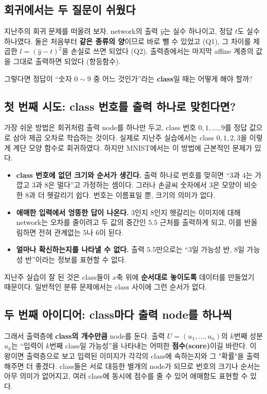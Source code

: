\documentclass[11pt,a4paper]{article}
\begin{document}
\subsection{회귀에서는 두 질문이 쉬웠다}

지난주의 회귀 문제를 떠올려 보자.
network의 출력 $\widehat y$는 실수 하나이고, 정답 $t$도 실수 하나였다.
둘은 처음부터 \textbf{같은 종류의 양}이므로 바로 뺄 수 있었고 (Q1),
그 차이를 제곱한 $l=(\widehat y-t)^2$을 손실로 쓰면 되었다 (Q2).
출력층에서는 마지막 affine 계층의 값을 그대로 출력하면 되었다 (항등함수).

그렇다면 정답이 ``숫자 $0\sim9$ 중 어느 것인가''라는 \textbf{class}일 때는 어떻게 해야 할까?

\subsection{첫 번째 시도: class 번호를 출력 하나로 맞힌다면?}

가장 쉬운 방법은 회귀처럼 출력 node를 하나만 두고,
class 번호 $0,1,\ldots,9$를 정답 값으로 삼아 제곱 오차로 학습하는 것이다.
실제로 지난주 실습에서는 class $0,1,2,3$을 이렇게 계단 모양 함수로 회귀하였다.
하지만 MNIST에서는 이 방법에 근본적인 문제가 있다.

\begin{itemize}[leftmargin=1.8em]
\item \textbf{class 번호에 없던 크기와 순서가 생긴다.}
출력 하나로 번호를 맞히면 ``$3$과 $4$는 가깝고 $3$과 $8$은 멀다''고 가정하는 셈이다.
그러나 손글씨 숫자에서 $3$은 모양이 비슷한 $8$과 더 헷갈리기 쉽다.
번호는 이름표일 뿐, 크기의 의미가 없다.
\item \textbf{애매한 입력에서 엉뚱한 답이 나온다.}
$3$인지 $8$인지 헷갈리는 이미지에 대해 network는 오차를 줄이려고 두 값의 중간인 $5.5$ 근처를 출력하게 되고,
이를 반올림하면 전혀 관계없는 $5$나 $6$이 된다.
\item \textbf{얼마나 확신하는지를 나타낼 수 없다.}
출력 $5.5$만으로는 ``$3$일 가능성 반, $8$일 가능성 반''이라는 정보를 표현할 수 없다.
\end{itemize}
지난주 실습이 잘 된 것은 class들이 $x$축 위에 \textbf{순서대로 놓이도록} 데이터를 만들었기 때문이다.
일반적인 분류 문제에서는 class 사이에 그런 순서가 없다.

\subsection{두 번째 아이디어: class마다 출력 node를 하나씩}

그래서 출력층에 \textbf{class의 개수만큼} node를 둔다.
출력 $U=(u_1,\ldots,u_n)$의 $k$번째 성분 $u_k$는 ``입력이 $k$번째 class일 가능성''을 나타내는 어떠한 \textbf{점수(score)}이길 바란다. 이왕이면 출력층으로 보고 입력된 이미지가 각각의 class에 속하는지와 그 "확률"을 출력해주면 더 좋겠다.
class들은 서로 대등한 별개의 node가 되므로 번호의 크기나 순서는 아무 의미가 없어지고,
여러 class에 동시에 점수를 줄 수 있어 애매함도 표현할 수 있다.
\end{document}
